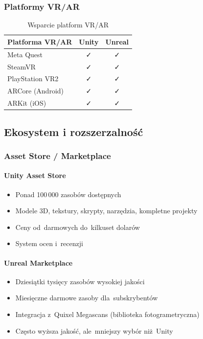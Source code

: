 \subsubsection{Platformy VR/AR}

\begin{table}[h!]
    \centering
    \caption{Wsparcie platform VR/AR}
    \label{tab:platform-vr}
    \begin{tabular}{|l|c|c|}
        \hline
        \textbf{Platforma VR/AR} & \textbf{Unity} & \textbf{Unreal} \\
        \hline\hline
        Meta Quest & ✓ & ✓ \\
        \hline
        SteamVR & ✓ & ✓ \\
        \hline
        PlayStation VR2 & ✓ & ✓ \\
        \hline
        ARCore (Android) & ✓ & ✓ \\
        \hline
        ARKit (iOS) & ✓ & ✓ \\
        \hline
    \end{tabular}
\end{table}

\subsection{Ekosystem i rozszerzalność}

\subsubsection{Asset Store / Marketplace}

\paragraph{Unity Asset Store}
\begin{itemize}
    \item Ponad 100\,000 zasobów dostępnych
    \item Modele 3D, tekstury, skrypty, narzędzia, kompletne projekty
    \item Ceny od~darmowych do~kilkuset dolarów
    \item System ocen i~recenzji
\end{itemize}

\paragraph{Unreal Marketplace}
\begin{itemize}
    \item Dziesiątki tysięcy zasobów wysokiej jakości
    \item Miesięczne darmowe zasoby dla~subskrybentów
    \item Integracja z~Quixel Megascans (biblioteka fotogrametryczna)
    \item Często wyższa jakość, ale~mniejszy wybór niż~Unity
\end{itemize}

